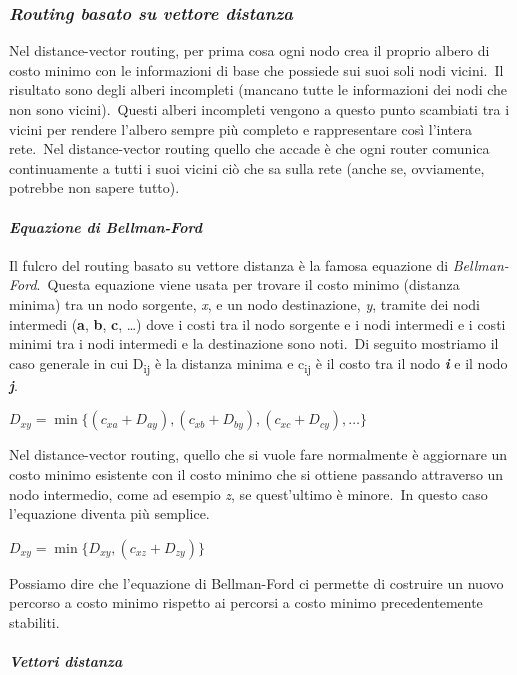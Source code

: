 \subsubsection{\emph{Routing basato su vettore distanza}}

Nel distance-vector routing, per prima cosa ogni nodo crea il proprio albero di costo minimo con le informazioni di base che possiede sui suoi soli nodi vicini.\
Il risultato sono degli alberi incompleti (mancano tutte le informazioni dei nodi che non sono vicini).\
Questi alberi incompleti vengono a questo punto scambiati tra i vicini per rendere l'albero sempre più completo e rappresentare così l'intera rete.\
Nel distance-vector routing quello che accade è che ogni router comunica continuamente a tutti i suoi vicini ciò che sa sulla rete (anche se, ovviamente, potrebbe non sapere tutto).

\paragraph{\emph{Equazione di Bellman-Ford}}

Il fulcro del routing basato su vettore distanza è la famosa equazione di \emph{Bellman-Ford}.\
Questa equazione viene usata per trovare il costo minimo (distanza minima) tra un nodo sorgente, \emph{x}, e un nodo destinazione, \emph{y}, tramite dei nodi intermedi (\textbf{a}, \textbf{b}, \textbf{c}, \dots) dove i costi tra il nodo sorgente e i nodi intermedi e i costi minimi tra i nodi intermedi e la destinazione sono noti.\
Di seguito mostriamo il caso generale in cui D\textsubscript{ij} è la distanza minima e c\textsubscript{ij} è il costo tra il nodo \textbf{\emph{i}} e il nodo \textbf{\emph{j}}.
\begin{center}
    $D_{xy} = \min\{(c_{xa}+D_{ay}), (c_{xb}+D_{by}), (c_{xc}+D_{cy}), \dots\}$
\end{center}
Nel distance-vector routing, quello che si vuole fare normalmente è aggiornare un costo minimo esistente con il costo minimo che si ottiene passando attraverso un nodo intermedio, come ad esempio \emph{z}, se quest'ultimo è minore.\
In questo caso l'equazione diventa più semplice.
\begin{center}
    $D_{xy} = \min\{D_{xy}, (c_{xz}+D_{zy})\}$
\end{center}
Possiamo dire che l'equazione di Bellman-Ford ci permette di costruire un nuovo percorso a costo minimo rispetto ai percorsi a costo minimo precedentemente stabiliti.

\paragraph{\emph{Vettori distanza}}


